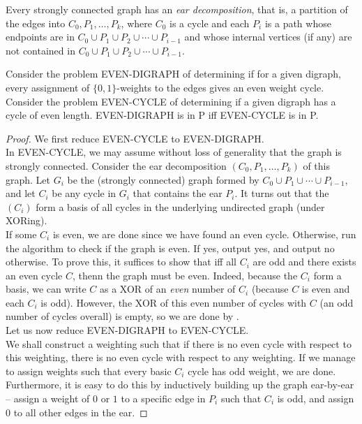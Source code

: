 \begin{fprop}
	Every strongly connected graph has an \emph{ear decomposition}, that is, a partition of the edges into $C_0,P_1,\ldots,P_k$, where $C_0$ is a cycle and each $P_i$ is a path whose endpoints are in $C_0 \cup P_1 \cup P_2 \cup \cdots \cup P_{i-1}$ and whose internal vertices (if any) are not contained in $C_0 \cup P_1 \cup P_2 \cup \cdots \cup P_{i-1}$.
\end{fprop}

\begin{ftheo}
	Consider the problem EVEN-DIGRAPH of determining if for a given digraph, every assignment of $\{0,1\}$-weights to the edges gives an even weight cycle. Consider the problem EVEN-CYCLE of determining if a given digraph has a cycle of even length. EVEN-DIGRAPH is in \textsf{P} iff EVEN-CYCLE is in \textsf{P}.
\end{ftheo}
\begin{proof}
	We first reduce EVEN-CYCLE to EVEN-DIGRAPH.\\
	In EVEN-CYCLE, we may assume without loss of generality that the graph is strongly connected. Consider the ear decomposition $(C_0,P_1,\ldots,P_k)$ of this graph. Let $G_i$ be the (strongly connected) graph formed by $C_0 \cup P_1 \cup \cdots \cup P_{i-1}$, and let $C_i$ be any cycle in $G_i$ that contains the ear $P_i$. It turns out that the $(C_i)$ form a basis of all cycles in the underlying undirected graph (under XORing).\\
	If some $C_i$ is even, we are done since we have found an even cycle. Otherwise, run the algorithm to check if the graph is even. If yes, output yes, and output no otherwise. To prove this, it suffices to show that iff all $C_i$ are odd and there exists an even cycle $C$, thenn the graph must be even. Indeed, because the $C_i$ form a basis, we can write $C$ as a XOR of an \emph{even} number of $C_i$ (because $C$ is even and each $C_i$ is odd). However, the XOR of this even number of cycles with $C$ (an odd number of cycles overall) is empty, so we are done by .\\

	Let us now reduce EVEN-DIGRAPH to EVEN-CYCLE.\\
	We shall construct a weighting such that if there is no even cycle with respect to this weighting, there is no even cycle with respect to any weighting. If we manage to assign weights such that every basic $C_i$ cycle has odd weight, we are done. Furthermore, it is easy to do this by inductively building up the graph ear-by-ear -- assign a weight of $0$ or $1$ to a specific edge in $P_i$ such that $C_i$ is odd, and assign $0$ to all other edges in the ear.
\end{proof}

